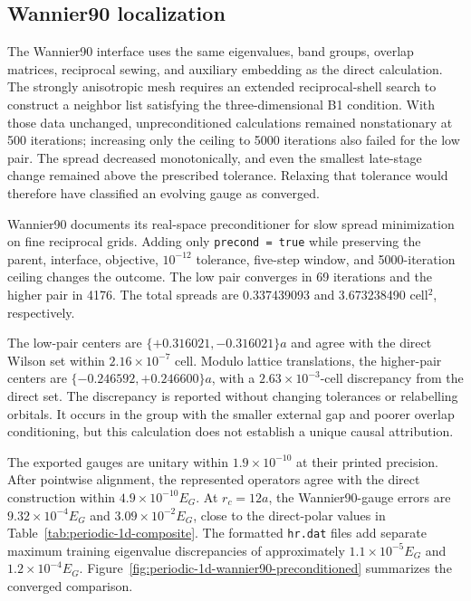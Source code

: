 \subsection{Wannier90 localization}

The Wannier90 interface uses the same eigenvalues, band groups, overlap
matrices, reciprocal sewing, and auxiliary embedding as the direct calculation.
The strongly anisotropic mesh requires an extended reciprocal-shell
search to construct a neighbor list satisfying the three-dimensional B1
condition. With those data unchanged, unpreconditioned calculations remained
nonstationary at 500 iterations; increasing only the ceiling to 5000 iterations
also failed for the low pair. The spread decreased monotonically, and even the
smallest late-stage change remained above the prescribed tolerance. Relaxing
that tolerance would therefore have classified an evolving gauge as converged.

Wannier90 documents its real-space preconditioner for slow spread minimization
on fine reciprocal grids. Adding only \texttt{precond = true} while preserving
the parent, interface, objective, $10^{-12}$ tolerance, five-step window, and
5000-iteration ceiling changes the outcome. The low pair converges in 69
iterations and the higher pair in 4176. The total spreads are 0.337439093 and
3.673238490 cell$^2$, respectively.

The low-pair centers are $\{+0.316021,-0.316021\}a$ and agree with the direct
Wilson set within $2.16\times10^{-7}$ cell. Modulo lattice translations, the
higher-pair centers are $\{-0.246592,+0.246600\}a$, with a
$2.63\times10^{-3}$-cell discrepancy from the direct set. The discrepancy is reported without changing tolerances or relabelling
orbitals. It occurs in the group with the smaller external gap and poorer
overlap conditioning, but this calculation does not establish a unique causal
attribution.

The exported gauges are unitary within $1.9\times10^{-10}$ at their printed
precision. After pointwise alignment, the represented operators agree with the
direct construction within $4.9\times10^{-10}E_G$. At $r_c=12a$, the
Wannier90-gauge errors are $9.32\times10^{-4}E_G$ and
$3.09\times10^{-2}E_G$, close to the direct-polar values in
Table~\ref{tab:periodic-1d-composite}. The formatted \texttt{hr.dat} files add
separate maximum training eigenvalue discrepancies of approximately
$1.1\times10^{-5}E_G$ and $1.2\times10^{-4}E_G$.
Figure~\ref{fig:periodic-1d-wannier90-preconditioned} summarizes the converged
comparison.

